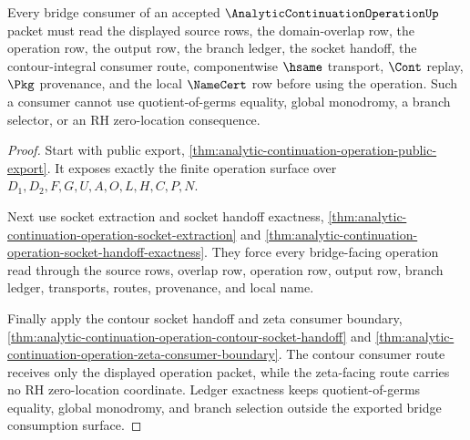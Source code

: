 \begin{theorem}
\label{thm:analytic-continuation-operation-bridge-consumption}
Every bridge consumer of an accepted $\AnalyticContinuationOperationUp$ packet must read the displayed source rows, the domain-overlap row, the operation row, the output row, the branch ledger, the socket handoff, the contour-integral consumer route, componentwise $\hsame$ transport, $\Cont$ replay, $\Pkg$ provenance, and the local $\NameCert$ row before using the operation. Such a consumer cannot use quotient-of-germs equality, global monodromy, a branch selector, or an RH zero-location consequence.
\end{theorem}
\begin{proof}
Start with public export, \autoref{thm:analytic-continuation-operation-public-export}. It exposes exactly the finite operation surface over $D_1,D_2,F,G,U,A,O,L,H,C,P,N$.

Next use socket extraction and socket handoff exactness, \autoref{thm:analytic-continuation-operation-socket-extraction} and \autoref{thm:analytic-continuation-operation-socket-handoff-exactness}. They force every bridge-facing operation read through the source rows, overlap row, operation row, output row, branch ledger, transports, routes, provenance, and local name.

Finally apply the contour socket handoff and zeta consumer boundary, \autoref{thm:analytic-continuation-operation-contour-socket-handoff} and \autoref{thm:analytic-continuation-operation-zeta-consumer-boundary}. The contour consumer route receives only the displayed operation packet, while the zeta-facing route carries no RH zero-location coordinate. Ledger exactness keeps quotient-of-germs equality, global monodromy, and branch selection outside the exported bridge consumption surface.
\end{proof}

